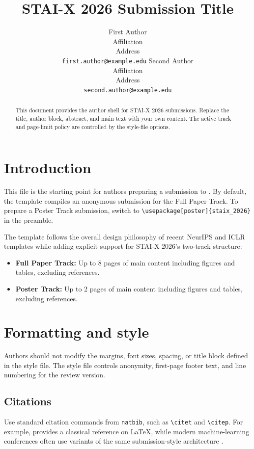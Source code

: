 \documentclass{article}
\title{STAI-X 2026 Submission Title}
\author{%
  First Author \\
  Affiliation \\
  Address \\
  \texttt{first.author@example.edu}
  \And
  Second Author \\
  Affiliation \\
  Address \\
  \texttt{second.author@example.edu}
}
\begin{document}
\maketitle

\begin{abstract}
This document provides the author shell for STAI-X 2026 submissions. Replace the title, author block, abstract, and main text with your own content. The active track and page-limit policy are controlled by the style-file options.
\end{abstract}

\staixcontentlimitnotice

\section{Introduction}
This file is the starting point for authors preparing a submission to \@staixshortname. By default, the template compiles an anonymous submission for the Full Paper Track. To prepare a Poster Track submission, switch to
\verb|\usepackage[poster]{staix_2026}| in the preamble.

The template follows the overall design philosophy of recent NeurIPS and ICLR templates while adding explicit support for STAI-X 2026's two-track structure:
\begin{itemize}
    \item \textbf{Full Paper Track:} Up to 8 pages of main content including figures and tables, excluding references.
    \item \textbf{Poster Track:} Up to 2 pages of main content including figures and tables, excluding references.
\end{itemize}

\section{Formatting and style}
Authors should not modify the margins, font sizes, spacing, or title block defined in the style file. The style file controls anonymity, first-page footer text, and line numbering for the review version.

\subsection{Citations}
Use standard citation commands from \texttt{natbib}, such as \verb|\citet| and \verb|\citep|. For example, \citet{lamport1994latex} provides a classical reference on \LaTeX{}, while modern machine-learning conferences often use variants of the same submission-style architecture \citep{goodfellow2016deep}.
\end{document}
